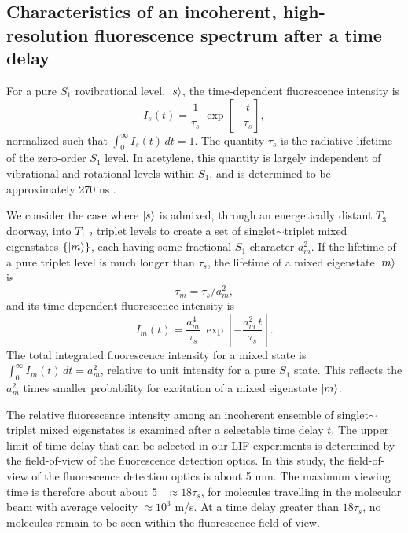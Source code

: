 \documentclass[12pt]{mitthesis}
\begin{document}
\subsection{Characteristics of an incoherent, high-resolution
  fluorescence spectrum after a time delay}

For a pure $S_1$ rovibrational level, $\mathinner{|{s}\rangle}$, the time-dependent
fluorescence intensity is
\begin{equation}
  I_s(t) = \frac{1}{\tau_s} \;
           \exp \left[
             -\frac{t}{ \tau_s} 
           \right],
\end{equation}
normalized such that $\int_0^{\infty} I_s(t) \, dt = 1$.  The quantity
$\tau_s$ is the radiative lifetime of the zero-order $S_1$ level.  In
acetylene, this quantity is largely independent of vibrational and
rotational levels within $S_1$, and is determined to be approximately
270 ns \cite{ochi91, stephenson84}.

We consider the case where $\mathinner{|{s}\rangle}$ is admixed, through an
energetically distant $T_3$ doorway, into $T_{1,2}$ triplet levels to
create a set of singlet$\sim$triplet mixed eigenstates $\lbrace
\mathinner{|{m}\rangle} \rbrace$, each having some fractional $S_1$ character $a_m^2$.
If the lifetime of a pure triplet level is much longer than $\tau_s$,
the lifetime of a mixed eigenstate $\mathinner{|{m}\rangle}$ is
\begin{equation}
  \label{eq:tau-m}
  \tau_m = \tau_s / a_m^2,
\end{equation}
and its time-dependent fluorescence intensity is
\begin{equation}
  \label{eq:int-m}
  I_m(t) = \frac{a_m^4}{\tau_s} \;
           \exp \left[
             -\frac{a_m^2 \, t}{\tau_s} 
           \right].
\end{equation}
The total integrated fluorescence intensity for a mixed state is
$\int_0^{\infty} I_m(t) \, dt = a_m^2$, relative to unit intensity for
a pure $S_1$ state.  This reflects the $a_m^2$ times smaller
probability for excitation of a mixed eigenstate $\mathinner{|{m}\rangle}$.

The relative fluorescence intensity among an incoherent ensemble of
singlet$\sim$triplet mixed eigenstates is examined after a selectable
time delay $t$.  The upper limit of time delay that can be selected in
our LIF experiments is determined by the field-of-view of the
fluorescence detection optics.  In this study, the field-of-view of
the fluorescence detection optics is about 5 mm.  The maximum viewing
time is therefore about about 5 \microsec\ $\approx 18\tau_s$, for
molecules travelling in the molecular beam with average velocity
$\approx 10^3$ m/s.  At a time delay greater than $18\tau_s$, no
molecules remain to be seen within the fluorescence field of view.
\end{document}
